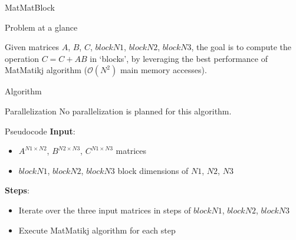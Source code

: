 \begin{chapter}{MatMatBlock}
    \begin{section}{Problem at a glance}
        \par Given matrices $A$, $B$, $C$, $blockN1$, $blockN2$, $blockN3$, the goal is to compute the  operation $C = C + AB$ in `blocks', by leveraging the best performance of MatMatikj algorithm ($\mathcal{O}(N^2)$ main memory accesses).
    \end{section}
    \begin{section}{Algorithm}
        \begin{subsection}{Parallelization}
            No parallelization is planned for this algorithm.
        \end{subsection}
        \begin{subsection}{Pseudocode}
            \textbf{Input}:
            \begin{itemize}
                \item $A^{N1 \times N2}$, $B^{N2 \times N3}$, $C^{N1 \times N3}$ matrices
                \item $blockN1$, $blockN2$, $blockN3$ block dimensions of $N1$, $N2$, $N3$
            \end{itemize}
            \textbf{Steps}:
            \begin{itemize}
                \item Iterate over the three input matrices in steps of $blockN1$, $blockN2$, $blockN3$
                \item Execute MatMatikj algorithm for each step
            \end{itemize}
            
        \end{subsection}
    \end{section}
\end{chapter}